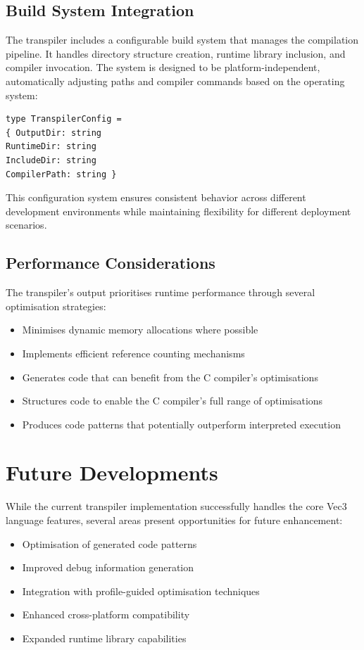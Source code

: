 \subsection{Build System Integration}
The transpiler includes a configurable build system that manages the compilation pipeline. It handles directory structure creation, runtime library inclusion, and compiler invocation. The system is designed to be platform-independent, automatically adjusting paths and compiler commands based on the operating system:
\begin{verbatim}
type TranspilerConfig =
{ OutputDir: string
RuntimeDir: string
IncludeDir: string
CompilerPath: string }
\end{verbatim}
This configuration system ensures consistent behavior across different development environments while maintaining flexibility for different deployment scenarios.

\subsection{Performance Considerations}
The transpiler's output prioritises runtime performance through several optimisation strategies:

\begin{itemize}
\item Minimises dynamic memory allocations where possible
\item Implements efficient reference counting mechanisms
\item Generates code that can benefit from the C compiler's optimisations
\item Structures code to enable the C compiler's full range of optimisations
\item Produces code patterns that potentially outperform interpreted execution
\end{itemize}

\section{Future Developments}
While the current transpiler implementation successfully handles the core Vec3 language features, several areas present opportunities for future enhancement:
\begin{itemize}
\item Optimisation of generated code patterns
\item Improved debug information generation
\item Integration with profile-guided optimisation techniques
\item Enhanced cross-platform compatibility
\item Expanded runtime library capabilities
\end{itemize}


